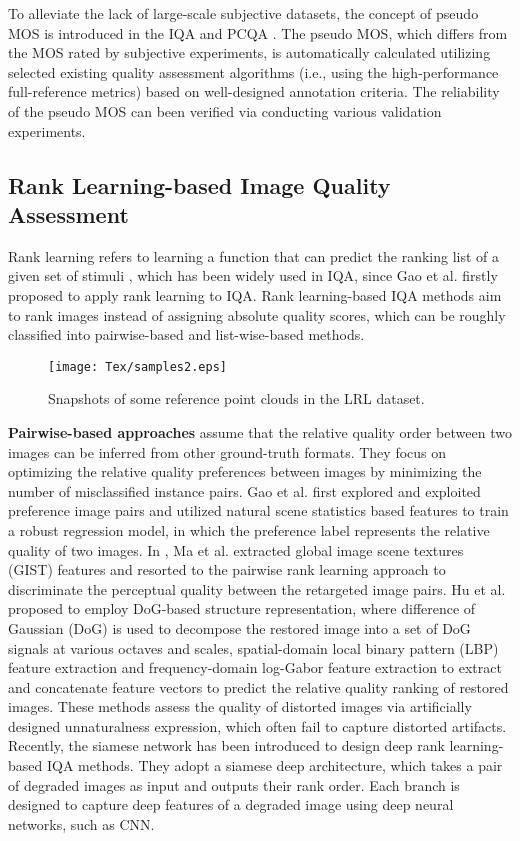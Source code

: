 To alleviate the lack of large-scale subjective datasets, the concept of pseudo MOS is introduced in the IQA \citep{Wujj20,oufz21} and PCQA \citep{Liuyp22}. 
The pseudo MOS, which differs from the MOS rated by subjective experiments, is automatically calculated utilizing selected existing quality assessment algorithms (i.e., using the high-performance full-reference metrics) based on well-designed annotation criteria.
The reliability of the pseudo MOS 
 \citep{Liuyp22} can been verified via conducting various validation experiments.

\subsection{Rank Learning-based Image Quality Assessment}

Rank learning refers to learning a function that can predict the ranking list of a given set of stimuli \citep{Liuty11,Guojf20}, which has been widely used in IQA, since Gao et al. \citep{Gaof15} firstly proposed to apply rank learning to IQA.
Rank learning-based IQA methods aim to rank images instead of assigning absolute quality scores, which can be roughly classified into pairwise-based and list-wise-based methods.

\begin{figure*}[tbp]
	\centering
	\texttt{[image: Tex/samples2.eps]}
	\caption{Snapshots of some reference point clouds in the LRL dataset.}
	\label{fig:samples}
\end{figure*}

\textbf{Pairwise-based approaches} assume that the relative quality order between two images can be inferred from other ground-truth formats. 
They focus on optimizing the relative quality preferences between images by minimizing the number of misclassified instance pairs.
Gao et al. \citep{Gaof15} first explored and exploited preference image pairs and utilized natural scene statistics based features to train a robust regression model, in which the preference label represents the relative quality of two images.
In \citep{Mal16}, Ma et al. extracted global image scene textures (GIST) features and resorted to the pairwise rank learning approach to discriminate the perceptual quality between the retargeted image pairs.
Hu et al. \citep{Hub19} proposed to employ DoG-based structure representation, where difference of Gaussian (DoG) is used to decompose the restored image into a set of DoG signals at various octaves and scales, spatial-domain local binary pattern (LBP) feature extraction and frequency-domain log-Gabor feature extraction to extract and concatenate feature vectors to predict the relative quality ranking of restored images.
These methods assess the quality of distorted images via artificially designed unnaturalness expression, which often fail to capture distorted artifacts.
Recently, the siamese network \citep{Liuxl17,Mengxd21,Fuzq22} has been introduced to design deep rank learning-based IQA methods.
They adopt a siamese deep architecture, which takes a pair of degraded images as input and outputs their rank order. 
Each branch is designed to capture deep features of a degraded image using deep neural networks, such as CNN.

